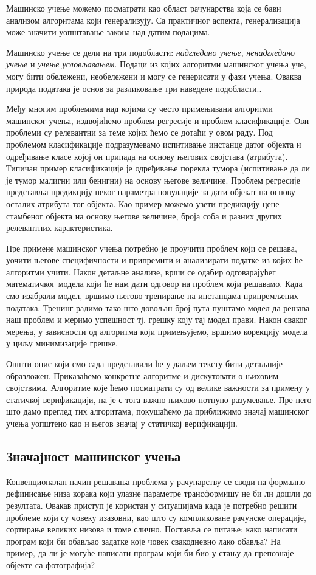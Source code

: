 \documentclass[a4paper]{article}
\begin{document}
{Машинско учење можемо посматрати као област рачунарства која се бави анализом алгоритама који генерализују. Са практичног аспекта, генерализација може значити уопштавање закона над датим подацима.


Машинско учење се дели на три подобласти: \textit{надгледано учење}, \textit{ненадгледано учење} и \textit{учење условљавањем}. Подаци из којих алгоритми машинског учења уче, могу бити обележени, необележени и могу се генерисати у фази учења. Оваква природа података је основ за разликовање три наведене подобласти.\cite{tom-ml}.


Међу многим проблемима над којима су често примењивани алгоритми машинског учења, издвојићемо проблем регресије и проблем класификације. Ови проблеми су релевантни за теме којих ћемо се дотаћи у овом раду. Под проблемом класификације подразумевамо испитивање инстанце датог објекта и одређивање класе којој он припада на основу његових својстава (атрибута). Типичан пример класификације је одређивање порекла тумора (испитивање да ли је тумор малигни или бенигни) на основу његове величине. Проблем регресије представља предикцију неког параметра популације за дати објекат на основу осталих атрибута тог објекта. Као пример можемо узети предикцију цене стамбеног објекта на основу његове величине, броја соба и разних других релевантних карактеристика.


Пре примене машинског учења потребно је проучити проблем који се решава, уочити његове специфичности и припремити и анализирати податке из којих ће алгоритми учити. Након детаљне анализе, врши се одабир одговарајућег математичког модела који ће нам дати одговор на проблем који решавамо. Када смо изабрали модел, вршимо његово тренирање на инстанцама припремљених података. Тренинг радимо тако што довољан број пута пуштамо модел да решава наш проблем и меримо успешност тј. грешку коју тај модел прави. Након сваког мерења, у зависности од алгоритма који примењујемо, вршимо корекцију модела у циљу минимизације грешке.


Општи опис који смо сада представили ће у даљем тексту бити детаљније образложен. Приказаћемо конкретне алгоритме и дискутовати о њиховим својствима. Алгоритме које ћемо посматрати су од велике важности за примену у статичкој верификацији, па је с тога важно њихово потпуно разумевање. Пре него што дамо преглед тих алгоритама, покушаћемо да приближимо значај машинског учења уопштено као и његов значај у статичкој верификацији.


\subsection{Значајност машинског учења}
Конвенционалан начин решавања проблема у рачунарству се своди на формално дефинисање низа корака који улазне параметре трансформишу не би ли дошли до резултата. Овакав приступ је користан у ситуацијама када је потребно решити проблеме који су човеку изазовни, као што су компликоване рачунске операције, сортирање великих низова и томе слично. Поставља се питање: како написати програм који би обављао задатке које човек свакодневно лако обавља? На пример, да ли је могуће написати програм који би био у стању да препознаје објекте са фотографија?


}
\end{document}
